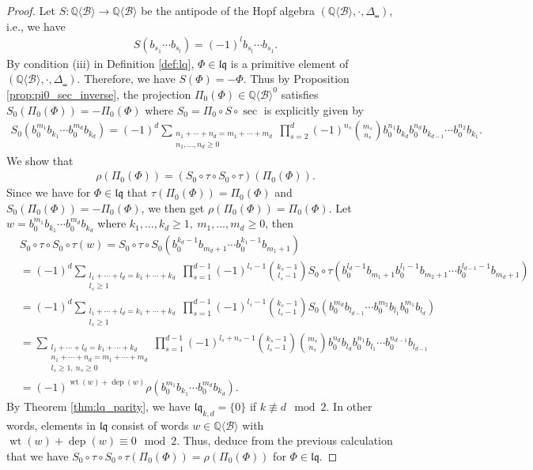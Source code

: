\documentclass[12pt,reqno]{amsart}
\numberwithin{equation}{section}
\theoremstyle{definition}
\newcommand{\QQ}{\mathbb{Q}}
\newcommand{\wt}{\operatorname{wt}}
\newcommand{\dep}{\operatorname{dep}}
\newcommand{\B}{\mathcal{B}}
\newcommand{\QB}{\QQ\langle \B\rangle}
\newcommand{\lqq}{\mathfrak{lq}}
\newcommand{\shco}{\Delta_{\shuffle}}
\newcommand{\pizero}{\Pi_0}
\begin{document}
\begin{proof} Let $S:\QB\to \QB$ be the antipode of the Hopf algebra $(\QB,\cdot,\shco)$, i.e., we have
\begin{align} \label{eq:antipode}
S(b_{s_1}\cdots b_{s_l})=(-1)^l b_{s_l}\cdots b_{s_1}.
\end{align}
By condition (iii) in Definition \ref{def:lq}, $\Phi\in \lqq$ is a primitive element of $(\QB,\cdot,\shco)$. Therefore, we have $S(\Phi)=-\Phi$. Thus by Proposition \ref{prop:pi0_sec_inverse}, the projection $\pizero(\Phi)\in \QB^0$ satisfies $S_0(\pizero(\Phi))=-\pizero(\Phi)$ where $S_0=\pizero\circ S\circ \sec$ is explicitly given by
\begin{align} \label{eq:S_0}
S_0(b_0^{m_1}b_{k_1}\cdots b_0^{m_d}b_{k_d})=(-1)^d \sum_{\substack{n_1+\cdots+n_d=m_1+\cdots+m_d \\ n_1,\ldots,n_d\geq 0}} \prod_{s=2}^d (-1)^{n_s} \binom{m_s}{n_s} b_0^{n_1}b_{k_d}b_0^{n_d}b_{k_{d-1}}\cdots b_0^{n_2}b_{k_1}.
\end{align}
We show that 
\begin{align*} 
\rho(\pizero(\Phi))=(S_0\circ \tau\circ S_0\circ \tau)(\pizero(\Phi)).
\end{align*}
Since we have for $\Phi\in \lqq$ that $\tau(\pizero(\Phi))=\pizero(\Phi)$ and $S_0(\pizero(\Phi))=-\pizero(\Phi)$, we then get $\rho(\pizero(\Phi))=\pizero(\Phi)$. Let $w=b_0^{m_1}b_{k_1}\cdots b_0^{m_d}b_{k_d}$ where $k_1,\ldots,k_d\geq1,\ m_1,\ldots,m_d\geq0$, then
\begin{align}  \label{eq:rho_equal_S_tau}
&S_0\circ \tau\circ S_0\circ \tau(w)=S_0\circ \tau\circ S_0(b_0^{k_d-1}b_{m_d+1}\cdots b_0^{k_1-1}b_{m_1+1}) \nonumber\\
&=(-1)^d \sum_{\substack{l_1+\cdots+l_d=k_1+\cdots+k_d \\ l_s\geq1}} \prod_{s=1}^{d-1} (-1)^{l_s-1} \binom{k_s-1}{l_s-1} S_0\circ\tau(b_0^{l_d-1}b_{m_1+1}b_0^{l_1-1}b_{m_2+1}\cdots b_0^{l_{d-1}-1}b_{m_d+1}) \nonumber\\
&=(-1)^d \sum_{\substack{l_1+\cdots+l_d=k_1+\cdots+k_d \\ l_s\geq1}} \prod_{s=1}^{d-1} (-1)^{l_s-1} \binom{k_s-1}{l_s-1} S_0(b_0^{m_d}b_{l_{d-1}}\cdots b_0^{m_2}b_{l_1}b_0^{m_1}b_{l_d}) \nonumber\\
&=\sum_{\substack{l_1+\cdots+l_d=k_1+\cdots+k_d \\ n_1+\cdots+n_d=m_1+\cdots+m_d \\ l_s\geq1,\ n_s\geq0}} \prod_{s=1}^{d-1} (-1)^{l_s+n_s-1}\binom{k_s-1}{l_s-1} \binom{m_s}{n_s} b_0^{n_d}b_{l_d}b_0^{n_1}b_{l_1}\cdots b_0^{n_{d-1}}b_{l_{d-1}} \nonumber\\
&=(-1)^{\wt(w)+\dep(w)}\rho(b_0^{m_1}b_{k_1}\cdots b_0^{m_d}b_{k_d}).
\end{align}
By Theorem \ref{thm:lq_parity}, we have $\lqq_{k,d}=\{0\}$ if $k\not\equiv d\mod 2$. In other words, elements in $\lqq$ consist of words $w\in \QB$ with $\wt(w)+\dep(w)\equiv 0\mod 2$. Thus, deduce from the previous calculation that we have $S_0\circ \tau\circ S_0\circ \tau(\pizero(\Phi))=\rho(\pizero(\Phi))$ for $\Phi\in\lqq$.
\end{proof}
\end{document}
